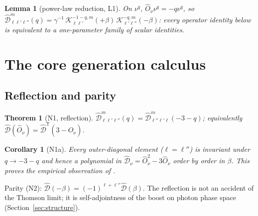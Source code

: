 \documentclass[useAMS,usenatbib]{article}
\newcommand{\Oh}{\hat{O}_\nu}
\newcommand{\Dv}{\hat{\mathcal{D}}_\nu}
\newcommand{\Kk}{\mathcal{K}}
\newcommand{\Do}{\hat{\mathcal{D}}}
\newtheorem{theorem}{Theorem}
\newtheorem{lemma}{Lemma}
\newtheorem{corollary}{Corollary}
\begin{document}
\begin{lemma}[power-law reduction, L1]
On $\nu^q$, $\Oh\nu^q = -q\nu^q$, so
$\Do^m_{\ell\ell'\ell''}(q) = \gamma^{-1}\,\Kk^{-1-q,m}_{\ell\ell'}(+\beta)\,\Kk^{-q,m}_{\ell'\ell''}(-\beta)$:
every operator identity below is equivalent to a one-parameter family of scalar identities.
\end{lemma}

\section{The core generation calculus}\label{sec:core}

\subsection{Reflection and parity}
\begin{theorem}[N1, reflection]
$\Do^m_{\ell\ell'\ell''}(q) = \Do^m_{\ell''\ell'\ell}(-3-q)$; equivalently
$\Do(\Oh) = \Do^{\mathsf T}(3-\Oh)$.
\end{theorem}
\begin{corollary}[N1a]
Every outer-diagonal element ($\ell = \ell''$) is invariant under $q\to-3-q$ and hence a polynomial in
$\Dv = \Oh^2 - 3\Oh$ order by order in $\beta$. This proves the empirical observation of \citet[\S2.3]{RC26}.
\end{corollary}
Parity (N2): $\Do(-\beta) = (-1)^{\ell+\ell''}\Do(\beta)$. The reflection is not an accident of the Thomson
limit; it is self-adjointness of the boost on photon phase space (Section~\ref{sec:structure}).
\end{document}
